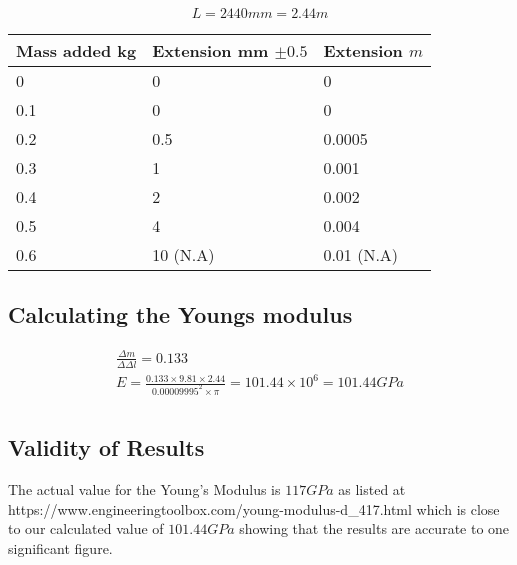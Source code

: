 \documentclass{article}
\begin{document}
\begin{equation}
	L = 2440\si{mm} = 2.44 \si {m}
\end{equation}


\begin{center}
    \begin{tabular}{l|l|l}
     Mass added \si{kg} & Extension \si{mm} $\pm 0.5$ & Extension $\si{m}$ \\ \hline
     0 & 0 & 0 \\
     0.1 & 0 & 0 \\
     0.2 & 0.5 & 0.0005 \\
     0.3 & 1 & 0.001\\
     0.4 & 2 & 0.002\\
     0.5 & 4 & 0.004\\
     0.6 & 10 (N.A) & 0.01 (N.A)\\
    \end{tabular}
\end{center}

\begin{center}

\end{center}

\subsection{Calculating the Youngs modulus}
\begin{gather}
	\frac{\Delta m}{\Delta \Delta l} = 0.133 \\
	E = \frac{0.133 \times 9.81 \times 2.44}{0.00009995^2 \times \pi} = 101.44 \times 10^6 = 101.44 \si{GPa}\\
\end{gather}

\subsection{Validity of Results}
The actual value for the Young's Modulus is $117 \si{GPa}$ as listed at
https://www.engineeringtoolbox.com/young-modulus-d\_417.html
which is close to our calculated value of $101.44 \si{GPa}$ showing that
the results are accurate to one significant figure.
\end{document}
